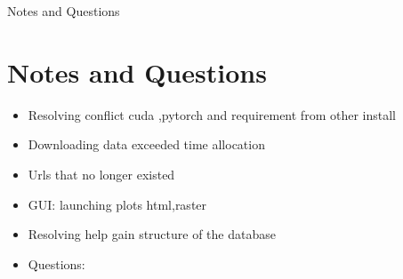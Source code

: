 \documentclass[xcolor = svgnames,hyperref = {colorlinks = true},]{beamer}
\newcommand{\sectframe}[1]{\begin{frame}{#1}
		\section{#1}
}
\begin{document}
\sectframe{Notes and Questions}
\begin{tcolorbox}[colback=blue!5!white,colframe=blue!75!black]
	\begin{itemize}{}
		\item{Resolving conflict cuda ,pytorch and requirement from other install}
		\item{Downloading data exceeded time allocation}
		\item{Urls that no longer existed}
		\item{GUI: launching plots html,raster}
		\item{Resolving help gain structure of the database}
		\item{Questions:}
	\end{itemize}
\end{tcolorbox}
\end{frame}
\end{document}
